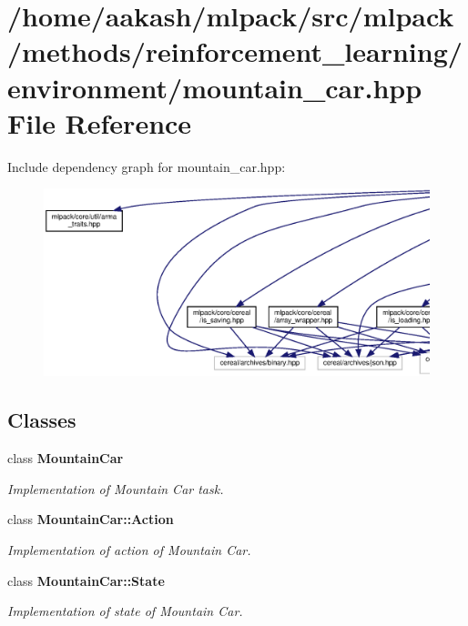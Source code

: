 \section{/home/aakash/mlpack/src/mlpack/methods/reinforcement\+\_\+learning/environment/mountain\+\_\+car.hpp File Reference}
\label{mountain__car_8hpp}
Include dependency graph for mountain\+\_\+car.\+hpp\+:
\nopagebreak
\begin{figure}[H]
\begin{center}
\leavevmode
\includegraphics[width=350pt]{mountain__car_8hpp__incl}
\end{center}
\end{figure}
\subsection*{Classes}
\begin{DoxyCompactItemize}
\item 
class \textbf{ Mountain\+Car}
\begin{DoxyCompactList}\small\item\em Implementation of Mountain Car task. \end{DoxyCompactList}\item 
class \textbf{ Mountain\+Car\+::\+Action}
\begin{DoxyCompactList}\small\item\em Implementation of action of Mountain Car. \end{DoxyCompactList}\item 
class \textbf{ Mountain\+Car\+::\+State}
\begin{DoxyCompactList}\small\item\em Implementation of state of Mountain Car. \end{DoxyCompactList}\end{DoxyCompactItemize}

